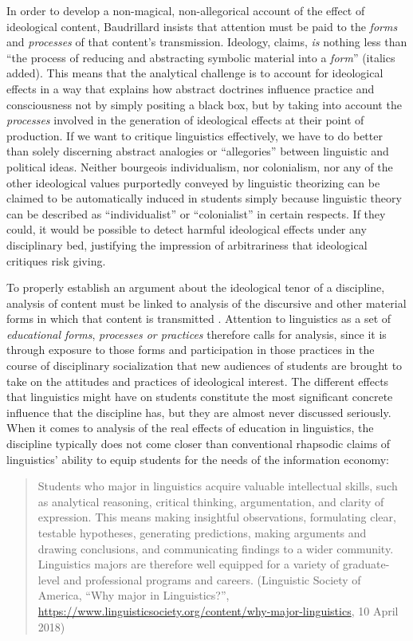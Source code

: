 \documentclass[output=paper]{langscibook}
\begin{document}
In order to develop a non-magical, non-allegorical account of the effect of ideological content, Baudrillard insists that attention must be paid to the \emph{forms} and \emph{processes} of that content's transmission. Ideology, \citet[80]{Baudrillard19881972} claims, \emph{is} nothing less than ``the process of reducing and abstracting symbolic material into a \emph{form}'' (italics added). This means that the analytical challenge is to account for ideological effects in a way that explains how abstract doctrines influence practice and consciousness not by simply positing a black box, but by taking into account the \emph{processes} involved in the generation of ideological effects at their point of production. If we want to critique linguistics effectively, we have to do better than solely discerning abstract analogies or ``allegories'' between linguistic and political ideas. Neither bourgeois individualism, nor colonialism, nor any of the other ideological values purportedly conveyed by linguistic theorizing can be claimed to be automatically induced in students simply because linguistic theory can be described as ``individualist'' or ``colonialist'' in certain respects. If they could, it would be possible to detect harmful ideological effects under any disciplinary bed, justifying the impression of arbitrariness that ideological critiques risk giving.

To properly establish an argument about the ideological tenor of a discipline, analysis of content must be linked to analysis of the discursive and other material forms in which that content is transmitted \citep[cf.][]{Debry19961994}. Attention to linguistics as a set of \emph{educational forms}, \emph{processes or practices} therefore calls for analysis, since it is through exposure to those forms and participation in those practices in the course of disciplinary socialization that new audiences of students are brought to take on the attitudes and practices of ideological interest. The different effects that linguistics might have on students constitute the most significant concrete influence that the discipline has, but they are almost never discussed seriously. When it comes to analysis of the real effects of education in linguistics, the discipline typically does not come closer than conventional rhapsodic claims of linguistics' ability to equip students for the needs of the information economy:

\begin{quotation}
Students who major in linguistics acquire valuable intellectual skills, such as analytical reasoning, critical thinking, argumentation, and clarity of expression. This means making insightful observations, formulating clear, testable hypotheses, generating predictions, making arguments and drawing conclusions, and communicating findings to a wider community. Linguistics majors are therefore well equipped for a variety of graduate-level and professional programs and careers. (Linguistic Society of America, ``Why major in Linguistics?'', \url{https://www.linguisticsociety.org/content/why-major-linguistics}, 10 April 2018)
\end{quotation}
\end{document}
